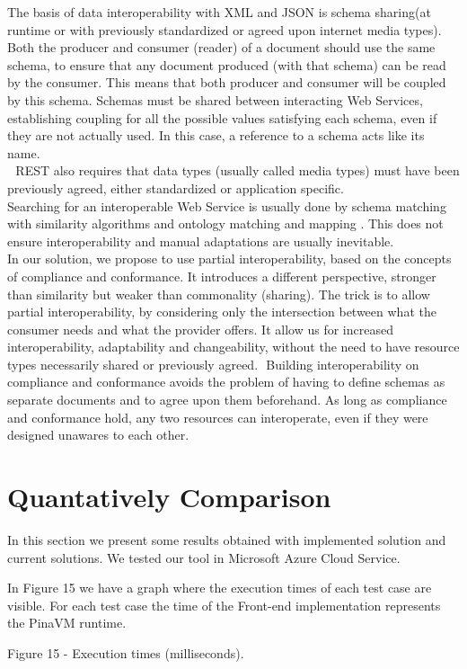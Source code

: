 The basis of data interoperability with XML and JSON is schema sharing(at runtime or with previously standardized
or agreed upon internet media types). Both the producer and consumer (reader) of a document should use the same
schema, to ensure that any document produced (with that schema) can be read by the consumer. This means that
both producer and consumer will be coupled by this schema. Schemas must be shared between interacting Web Services,
 establishing coupling for all the possible values satisfying each schema, even if they are not actually used.
 In this case, a reference to a schema acts like its name.\\
 
REST also requires that data types (usually called media types) must have been previously agreed, either
standardized or application specific.\\
Searching for an interoperable Web Service is usually done by schema matching with similarity algorithms \citep{expertsystems:x1}
and ontology matching and mapping \citep{Ontology:matching}. This does not ensure interoperability and manual adaptations are usually
inevitable. \\
In our solution, we propose to use partial interoperability, based on the concepts of compliance and conformance.
It introduces a different
perspective, stronger than similarity but weaker than commonality (sharing). The trick is to allow partial
interoperability, by considering only the intersection between what the consumer needs and what the provider offers.
It allow us for increased interoperability, adaptability and changeability, without the need to have resource types
necessarily shared or previously agreed. 
Building interoperability on compliance and conformance avoids the problem of having to define schemas as
separate documents and to agree upon them beforehand. As long as compliance and conformance hold, any two
resources can interoperate, even if they were designed unawares to each other.

\section{Quantatively Comparison}
In this section we present some results obtained with implemented solution and current solutions. We tested our
tool in Microsoft Azure Cloud Service.

In Figure 15 we have a graph where the execution times of each test case are visible. For each test case the time of the Front-end implementation represents the PinaVM runtime.

Figure 15 - Execution times (milliseconds).

